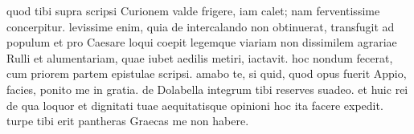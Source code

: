  quod tibi supra scripsi Curionem valde frigere, iam calet; nam ferventissime concerpitur. levissime enim, quia de intercalando non obtinuerat, transfugit ad populum et pro Caesare loqui coepit legemque viariam non dissimilem agrariae Rulli et alumentariam, quae iubet aedilis metiri, iactavit. hoc nondum fecerat, cum priorem partem epistulae scripsi. amabo te, si quid, quod opus fuerit Appio, facies, ponito me in gratia. de Dolabella integrum tibi reserves suadeo. et huic rei de qua loquor et dignitati tuae aequitatisque opinioni hoc ita facere expedit. turpe tibi erit pantheras Graecas me non habere.
